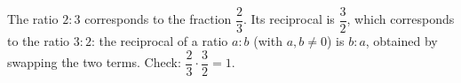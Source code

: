 The ratio $2:3$ corresponds to the fraction $\dfrac{2}{3}$. Its reciprocal is $\dfrac{3}{2}$, which corresponds to the ratio $\boxed{3:2}$: the reciprocal of a ratio $a:b$ (with $a,b\ne0$) is $b:a$, obtained by swapping the two terms. Check: $\dfrac{2}{3}\cdot\dfrac{3}{2}=1$.
